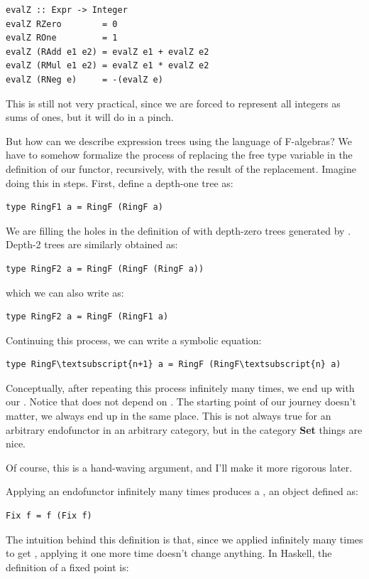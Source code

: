 \begin{verbatim}
evalZ :: Expr -> Integer
evalZ RZero        = 0
evalZ ROne         = 1
evalZ (RAdd e1 e2) = evalZ e1 + evalZ e2
evalZ (RMul e1 e2) = evalZ e1 * evalZ e2
evalZ (RNeg e)     = -(evalZ e)
\end{verbatim}
This is still not very practical, since we are forced to represent all
integers as sums of ones, but it will do in a pinch.

But how can we describe expression trees using the language of
F-algebras? We have to somehow formalize the process of replacing the
free type variable in the definition of our functor, recursively, with
the result of the replacement. Imagine doing this in steps. First,
define a depth-one tree as:

\begin{verbatim}
type RingF1 a = RingF (RingF a)
\end{verbatim}
We are filling the holes in the definition of  with
depth-zero trees generated by . Depth-2 trees are
similarly obtained as:

\begin{verbatim}
type RingF2 a = RingF (RingF (RingF a))
\end{verbatim}
which we can also write as:

\begin{verbatim}
type RingF2 a = RingF (RingF1 a)
\end{verbatim}
Continuing this process, we can write a symbolic equation:

\begin{Verbatim}[commandchars=\\\{\}]
type RingF\textsubscript{n+1} a = RingF (RingF\textsubscript{n} a)
\end{Verbatim}
Conceptually, after repeating this process infinitely many times, we end
up with our . Notice that  does not depend on
. The starting point of our journey doesn't matter, we always
end up in the same place. This is not always true for an arbitrary
endofunctor in an arbitrary category, but in the category \textbf{Set}
things are nice.

Of course, this is a hand-waving argument, and I'll make it more
rigorous later.

Applying an endofunctor infinitely many times produces a , an object defined as:

\begin{verbatim}
Fix f = f (Fix f)
\end{verbatim}
The intuition behind this definition is that, since we applied
 infinitely many times to get , applying it one
more time doesn't change anything. In Haskell, the definition of a fixed
point is:

